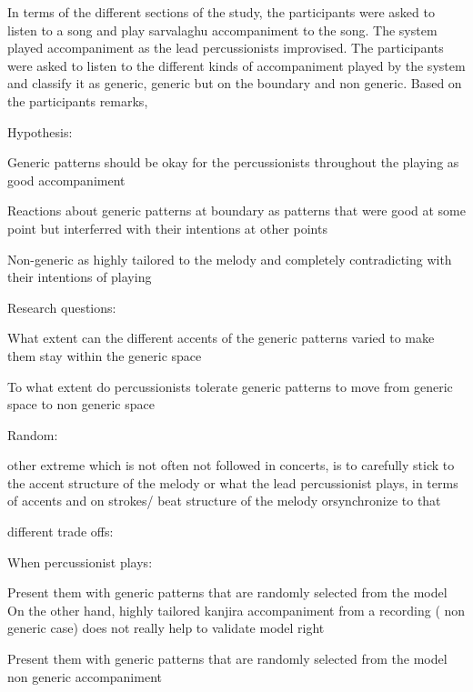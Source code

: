 In terms of the different sections of the study, the participants were asked to listen to a song and play sarvalaghu accompaniment to the song. The system played accompaniment as the lead percussionists improvised. The participants were asked to listen to the different kinds of accompaniment played by the system and classify it as generic, generic but on the boundary and non generic. Based on the participants remarks, 



Hypothesis:

Generic patterns should be okay for the percussionists throughout the playing as good accompaniment

Reactions about generic patterns at boundary as patterns that were good at some point but 
interferred with their intentions at other points

Non-generic as highly tailored to the melody and completely contradicting with their intentions of playing


Research questions:

What extent can the different accents of the generic patterns varied to make them stay within the generic space 

To what extent do percussionists tolerate generic patterns to move from generic space to non generic space




Random:

other extreme which is not often not followed in concerts, is to carefully stick to the accent structure of the melody or what the lead percussionist plays, in terms of accents and on strokes/ beat structure of the melody orsynchronize to that


different trade offs: 

When percussionist plays:

Present them with generic patterns that are randomly selected from the model
On the other hand, highly tailored kanjira accompaniment from a recording ( non generic case)
does not really help to validate model right


Present them with generic patterns that are randomly selected from the model
non generic accompaniment 




